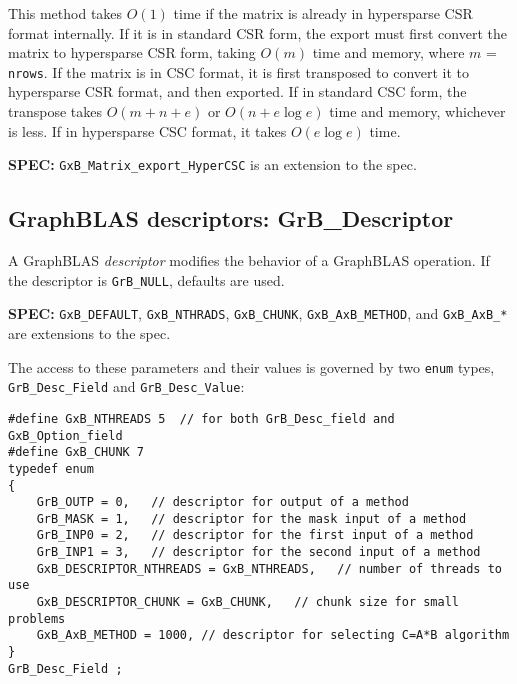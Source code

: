 \documentclass[12pt]{article}
\begin{document}
This method takes $O(1)$ time if the matrix is already in hypersparse CSR
format internally.  If it is in standard CSR form, the export must first
convert the matrix to hypersparse CSR form, taking $O(m)$ time and memory,
where $m$ = \verb'nrows'.  If the matrix is in CSC format, it is first
transposed to convert it to hypersparse CSR format, and then exported.  If in
standard CSC form, the transpose takes $O(m+n+e)$ or $O(n + e \log e)$ time and
memory, whichever is less.  If in hypersparse CSC format, it takes $O(e \log
e)$ time.

\begin{spec}
{\bf SPEC:} \verb'GxB_Matrix_export_HyperCSC' is an extension to the spec.
\end{spec}

\newpage
\subsection{GraphBLAS descriptors: {\sf GrB\_Descriptor}} %
\label{descriptor}

A GraphBLAS {\em descriptor} modifies the behavior of a GraphBLAS operation.
If the descriptor is \verb'GrB_NULL', defaults are used.

\begin{spec}
{\bf SPEC:} \verb'GxB_DEFAULT', \verb'GxB_NTHRADS', \verb'GxB_CHUNK',
\verb'GxB_AxB_METHOD', and \verb'GxB_AxB_*'
are extensions to the spec.
\end{spec}

The access to these parameters and their values is governed
by two \verb'enum' types, \verb'GrB_Desc_Field' and \verb'GrB_Desc_Value':

\begin{mdframed}[userdefinedwidth=6in]
{\footnotesize
\begin{verbatim}
#define GxB_NTHREADS 5  // for both GrB_Desc_field and GxB_Option_field
#define GxB_CHUNK 7
typedef enum
{
    GrB_OUTP = 0,   // descriptor for output of a method
    GrB_MASK = 1,   // descriptor for the mask input of a method
    GrB_INP0 = 2,   // descriptor for the first input of a method
    GrB_INP1 = 3,   // descriptor for the second input of a method
    GxB_DESCRIPTOR_NTHREADS = GxB_NTHREADS,   // number of threads to use
    GxB_DESCRIPTOR_CHUNK = GxB_CHUNK,   // chunk size for small problems
    GxB_AxB_METHOD = 1000, // descriptor for selecting C=A*B algorithm
}
GrB_Desc_Field ;
\end{verbatim} } \end{mdframed}
\end{document}
